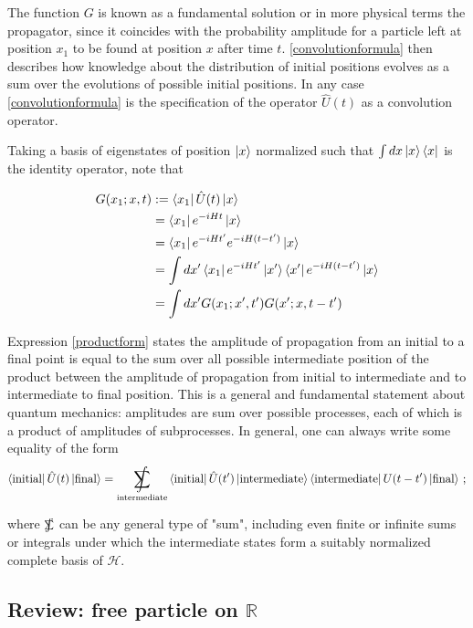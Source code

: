 \documentclass{article}
\DeclareMathOperator*{\SumInt}{%
\mathchoice%
  {\ooalign{$\displaystyle\sum$\cr\hidewidth$\displaystyle\int$\hidewidth\cr}}
  {\ooalign{\raisebox{.14\height}{\scalebox{.7}{$\textstyle\sum$}}\cr\hidewidth$\textstyle\int$\hidewidth\cr}}
  {\ooalign{\raisebox{.2\height}{\scalebox{.6}{$\scriptstyle\sum$}}\cr$\scriptstyle\int$\cr}}
  {\ooalign{\raisebox{.2\height}{\scalebox{.6}{$\scriptstyle\sum$}}\cr$\scriptstyle\int$\cr}}
}
\newcommand{\hil}{\ensuremath{\mathcal{H}}}
\begin{document}
The function $G$ is known as a fundamental solution or in more physical terms the propagator, since it coincides with the probability amplitude for a particle left at position $x_1$ to be found at position $x$ after time $t$. \eqref{convolutionformula} then describes how knowledge about the distribution of initial positions evolves as a sum over the evolutions of possible initial positions. In any case \eqref{convolutionformula} is the specification of the operator $\hat U(t)$ as a convolution operator.

Taking a basis of eigenstates of position $\ket x$ normalized such that $\int dx \ket{x} \bra{x}$ is the identity operator, note that

\begin{align}
    G(x_1;x,t) & := \bra{x_1} \hat U (t) \ket{x}\\
    & = \bra{x_1} e^{-i H t} \ket{x} \\
    & = \bra{x_1} e^{-i H t'} e^{-i H (t-t')} \ket{x} \\
    & = \int dx' \bra{x_1} e^{-i H t'} \ket{x'} \bra{x'} e^{-iH(t-t')} \ket{x}\\
    & = \int dx' G(x_1;x',t')G(x';x,t-t') \label{productform}
\end{align}

Expression \eqref{productform} states the amplitude of propagation from an initial to a final point is equal to the sum over all possible intermediate position of the product between the amplitude of propagation from initial to intermediate and to intermediate to final position. This is a general and fundamental statement about quantum mechanics: amplitudes are sum over possible processes, each of which is a product of amplitudes of subprocesses. In general, one can always write some equality of the form

\newcommand{\iniziale}{\bra{\text{initial}}}
\newcommand{\finale}{\ket{\text{final}}}

\begin{equation}\label{amplitudessum}
    \iniziale \hat U(t) \finale = \SumInt_{\text{intermediate}} \iniziale \hat U(t') \ket{\text{intermediate}} \bra{\text{intermediate}} U(t-t') \finale\,;
\end{equation}

where $\SumInt$ can be any general type of "sum", including even finite or infinite sums or integrals under which the intermediate states form a suitably normalized complete basis of $\hil$.


\subsection{Review: free particle on $\mathbb{R}$}
\end{document}
